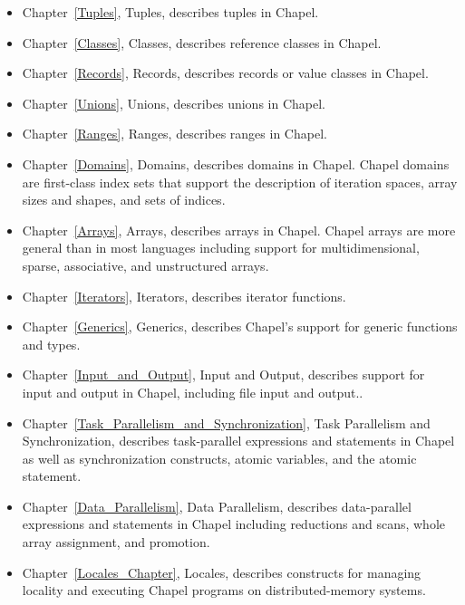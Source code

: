 \begin{itemize}
\item
Chapter~\ref{Tuples}, Tuples, describes tuples in Chapel.

\item
Chapter~\ref{Classes}, Classes, describes reference classes in Chapel.

\item
Chapter~\ref{Records}, Records, describes records or value classes in
Chapel.

\item
Chapter~\ref{Unions}, Unions, describes unions in Chapel.

\item
Chapter~\ref{Ranges}, Ranges, describes ranges in Chapel.

\item
Chapter~\ref{Domains}, Domains, describes domains in Chapel.  Chapel
domains are first-class index sets that support the description of
iteration spaces, array sizes and shapes, and sets of indices.

\item
Chapter~\ref{Arrays}, Arrays, describes arrays in Chapel.  Chapel arrays are
more general than in most languages including support for
multidimensional, sparse, associative, and unstructured arrays.

\item
Chapter~\ref{Iterators}, Iterators, describes iterator functions.

\item
Chapter~\ref{Generics}, Generics, describes Chapel's support for
generic functions and types.

\item
Chapter~\ref{Input_and_Output}, Input and Output, describes support
for input and output in Chapel, including file input and output..

\item
Chapter~\ref{Task_Parallelism_and_Synchronization}, Task Parallelism
and Synchronization, describes task-parallel expressions and statements
in Chapel as well as synchronization constructs, atomic variables, and
the atomic statement.

\item
Chapter~\ref{Data_Parallelism}, Data Parallelism, describes
data-parallel expressions and statements in Chapel including
reductions and scans, whole array assignment, and promotion.

\item
Chapter~\ref{Locales_Chapter}, Locales, describes constructs for managing
locality and executing Chapel programs on distributed-memory systems.


\end{itemize}
